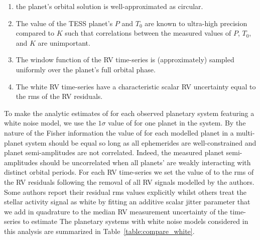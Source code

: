 \begin{enumerate}
\item the planet's orbital solution is well-approximated as circular.
\item The value of the TESS planet's $P$ and $T_0$ are known to ultra-high precision compared to $K$ such
  that correlations between the measured values of $P$, $T_0$, and $K$ are unimportant.
\item The window function of the RV time-series is (approximately) sampled uniformly over the planet's full
  orbital phase.
\item The white RV time-series have a characteristic scalar RV uncertainty equal to the rms of the RV residuals.
\end{enumerate}

\noindent To make the analytic estimates of \nrv{} for each observed planetary system featuring a white
noise model, we use the $1\sigma$ value of \sigK{} for one planet in the
system. By the nature of the Fisher information the value of \sigK{} for each modelled planet in a
multi-planet system should be equal so long as all ephemerides are well-constrained and
planet semi-amplitudes are not correlated. Indeed, the measured planet
semi-amplitudes should be uncorrelated when all planets' are weakly interacting with distinct orbital
periods. For each RV time-series we set the value of \sigeff{} to the
rms of the RV residuals following the removal of all RV signals modelled by the authors. Some authors
report their residual rms values explicitly whilst others treat the stellar activity signal as
white by fitting an additive scalar jitter parameter that we
add in quadrature to the median RV measurement uncertainty of the time-series to estimate 
The planetary systems with white noise models
considered in this analysis are summarized in Table~\ref{table:compare_white}.



